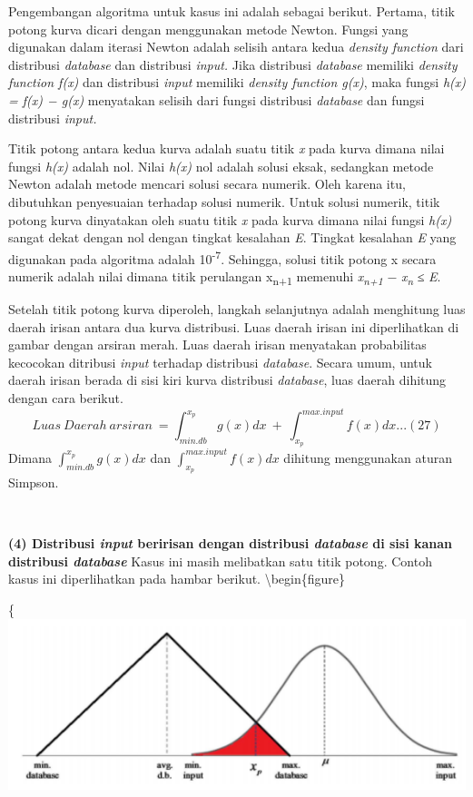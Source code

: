 \documentclass[
]{book}
\begin{document}
Pengembangan algoritma untuk kasus ini adalah sebagai berikut. Pertama, titik potong kurva dicari dengan menggunakan metode Newton. Fungsi yang digunakan dalam iterasi Newton adalah selisih antara kedua \emph{density function} dari distribusi \emph{database} dan distribusi \emph{input.} Jika distribusi \emph{database} memiliki \emph{density function f(x)} dan distribusi \emph{input} memiliki \emph{density function g(x)}, maka fungsi \emph{h(x) = f(x) − g(x)} menyatakan selisih dari fungsi distribusi \emph{database} dan fungsi distribusi \emph{input.}

Titik potong antara kedua kurva adalah suatu titik \emph{x} pada kurva dimana nilai fungsi \emph{h(x)} adalah nol. Nilai \emph{h(x)} nol adalah solusi eksak, sedangkan metode Newton adalah metode mencari solusi secara numerik. Oleh karena itu, dibutuhkan penyesuaian terhadap solusi numerik. Untuk solusi numerik, titik potong kurva dinyatakan oleh suatu titik \emph{x} pada kurva dimana nilai fungsi \emph{h(x)} sangat dekat dengan nol dengan tingkat kesalahan \emph{E}. Tingkat kesalahan \emph{E} yang digunakan pada algoritma adalah 10\textsuperscript{-7}. Sehingga, solusi titik potong x secara numerik adalah nilai dimana titik perulangan x\textsubscript{n+1} memenuhi \textbar{}\emph{x\textsubscript{n+1}} − \emph{x\textsubscript{n}}\textbar{} ≤ \emph{E}.

Setelah titik potong kurva diperoleh, langkah selanjutnya adalah menghitung luas daerah irisan antara dua kurva distribusi. Luas daerah irisan ini diperlihatkan di gambar dengan arsiran merah. Luas daerah irisan menyatakan probabilitas kecocokan ditribusi \emph{input} terhadap distribusi \emph{database}. Secara umum, untuk daerah irisan berada di sisi kiri kurva distribusi \emph{database}, luas daerah dihitung dengan cara berikut. \[Luas\ Daerah\ arsiran\ = \int_{min.db}^{x_p}g(x)dx\ +\ \int_{x_p}^{max.input}f(x)dx...(27) \]
Dimana \(\int_{min.db}^{x_p}g(x)dx\) dan \(\int_{x_p}^{max.input}f(x)dx\) dihitung menggunakan aturan Simpson.

~

\textbf{(4) Distribusi \emph{input} beririsan dengan distribusi \emph{database} di sisi kanan distribusi \emph{database}}
Kasus ini masih melibatkan satu titik potong. Contoh kasus ini diperlihatkan pada hambar berikut.
\textbackslash begin\{figure\}

\{\centering \includegraphics[width=0.5\linewidth]{images/screening/irisan2}
\end{document}
